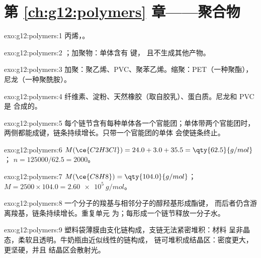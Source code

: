 \section*{第 \ref{ch:g12:polymers} 章——聚合物}

\begin{solution}{exo:g12:polymers:1}
丙烯，。
\end{solution}

\begin{solution}{exo:g12:polymers:2}
；加聚物：单体含有  键，
且不生成其他产物。
\end{solution}

\begin{solution}{exo:g12:polymers:3}
加聚：聚乙烯、PVC、聚苯乙烯。缩聚：PET（一种聚酯），
尼龙（一种聚酰胺）。
\end{solution}

\begin{solution}{exo:g12:polymers:4}
纤维素、淀粉、天然橡胶（取自胶乳）、蛋白质。尼龙和 PVC 是
合成的。
\end{solution}

\begin{solution}{exo:g12:polymers:5}
每个链节含有每种单体各一个官能团；单体带两个官能团时，
两侧都能成键，链条持续增长。只带一个官能团的单体
会使链条终止。
\end{solution}

\begin{solution}{exo:g12:polymers:6}
$M(\ce{C2H3Cl}) = 24.0 + 3.0 + 35.5 = \qty{62.5}{g/mol}$；
$n = 125000/62.5 = 2000$。
\end{solution}

\begin{solution}{exo:g12:polymers:7}
$M(\ce{C8H8}) = \qty{104.0}{g/mol}$；$M = 2500 \times 104.0 =
\qty{2.60e5}{g/mol}$。
\end{solution}

\begin{solution}{exo:g12:polymers:8}
一个分子的羧基与相邻分子的醇羟基形成酯键，
而后者仍含游离羧基，链条持续增长。重复单元
为；每形成一个链节释放一分子水。
\end{solution}

\begin{solution}{exo:g12:polymers:9}
塑料袋薄膜由支化链构成，支链无法紧密堆积：材料
呈非晶态，柔软且透明。牛奶瓶由近似线性的链构成，
链可堆积成结晶区：密度更大，更坚硬，并且
结晶区会散射光。
\end{solution}

